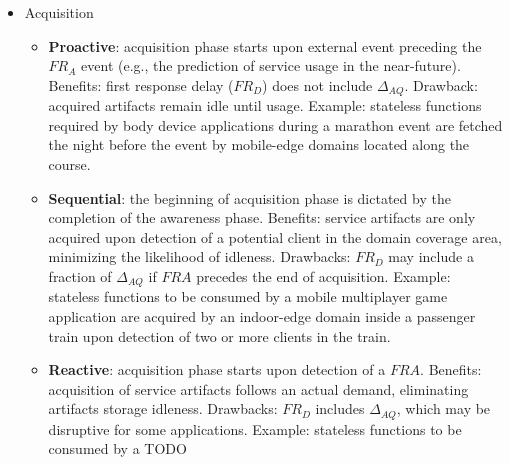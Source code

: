 \begin{itemize}
	
\item Acquisition

\begin{itemize}

\item \textbf{Proactive}: acquisition phase starts upon external event preceding the $FR_A$ event (e.g., the prediction of service usage in the near-future). Benefits: first response delay ($FR_D$) does not include $\Delta_{AQ}$. Drawback: acquired artifacts remain idle until usage. Example: stateless functions required by body device applications during a marathon event are fetched the night before the event by mobile-edge domains located along the course. 

\item \textbf{Sequential}: the beginning of acquisition phase is dictated by the completion of the awareness phase. Benefits: service artifacts are only acquired upon detection of a potential client in the domain coverage area, minimizing the likelihood of idleness. Drawbacks: $FR_D$ may include a fraction of $\Delta_{AQ}$ if $FRA$ precedes the end of acquisition. Example: stateless functions to be consumed by a mobile multiplayer game application are acquired by an indoor-edge domain inside a passenger train upon detection of two or more clients in the train.

\item \textbf{Reactive}: acquisition phase starts upon detection of a $FRA$. Benefits: acquisition of service artifacts follows an actual demand, eliminating artifacts storage idleness. Drawbacks: $FR_D$ includes $\Delta_{AQ}$, which may be disruptive for some applications. Example: stateless functions to be consumed by a TODO 
\medskip
\medskip
\bigskip
\bigskip


\end{itemize}
\end{itemize}

